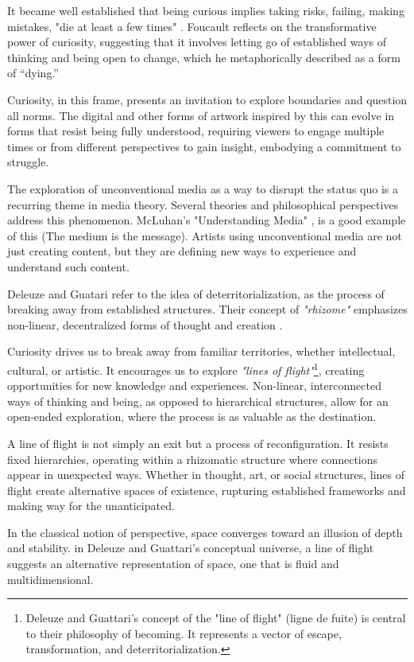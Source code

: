 It became well established that being curious implies taking risks, failing, making mistakes, "die at least a few times" \citep{foucault1980masked}. Foucault reflects on the transformative power of curiosity, suggesting that it involves letting go of established ways of thinking and being open to change, which he metaphorically described as a form of “dying.”

Curiosity, in this frame, presents an invitation to explore boundaries and question all norms. The digital and other forms of artwork inspired by this can evolve in forms that resist being fully understood, requiring viewers to engage multiple times or from different perspectives to gain insight, embodying a commitment to struggle.

The exploration of unconventional media as a way to disrupt the status quo is a recurring theme in media theory. Several theories and philosophical perspectives address this phenomenon. McLuhan's "Understanding Media" \citep{mcluhan1964}, is a good example of this (The medium is the message). Artists using unconventional media are not just creating content, but they are defining new ways to experience and understand such content.

Deleuze and Guatari refer to the idea of deterritorialization, as the process of breaking away from established structures. Their concept of \textit{"rhizome"} emphasizes non-linear, decentralized forms of thought and creation \citep{deleuze1980}.

Curiosity drives us to break away from familiar territories, whether intellectual, cultural, or artistic. It encourages us to explore \textit{"lines of flight"}\footnote{Deleuze and Guattari's concept of the "line of flight" (ligne de fuite) is central to their philosophy of becoming. It represents a vector of escape, transformation, and deterritorialization.}, creating opportunities for new knowledge and experiences. Non-linear, interconnected ways of thinking and being, as opposed to hierarchical structures, allow for an open-ended exploration, where the process is as valuable as the destination.

A line of flight is not simply an exit but a process of reconfiguration. It resists fixed hierarchies, operating within a rhizomatic structure where connections appear in unexpected ways. Whether in thought, art, or social structures, lines of flight create alternative spaces of existence, rupturing established frameworks and making way for the unanticipated.

In the classical notion of perspective, space converges toward an illusion of depth and stability. in Deleuze and Guattari's conceptual universe, a line of flight suggests an alternative representation of space, one that is fluid and multidimensional.